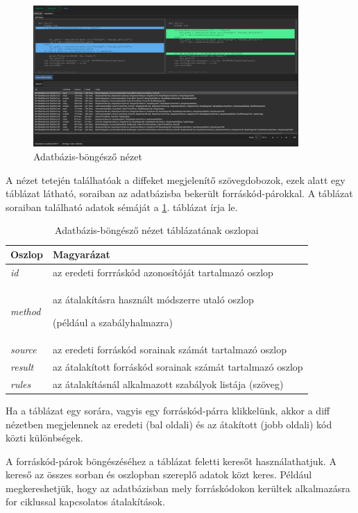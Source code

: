 \begin{figure}[H]
	\centering
	\includegraphics[width=0.9\textwidth]{images/screenshots/database_tab.png}
	\caption{Adatbázis-böngésző nézet}
\end{figure}

A nézet tetején találhatóak a diffeket megjelenítő szövegdobozok, ezek alatt
egy táblázat látható, soraiban az adatbázisba bekerült forráskód-párokkal.
A táblázat soraiban található adatok sémáját a \ref{tab:schema}. táblázat írja le.

\begin{table}[H]
	\centering
	\begin{tabular}{ | m{} | m{} | }
		\hline
		\textbf{Oszlop} & \textbf{Magyarázat} \\
		\hline \hline

		\emph{id}
		& az eredeti forrráskód azonosítóját tartalmazó oszlop \\
		\hline
		
		\emph{method}
		& az átalakításra használt módszerre utaló oszlop
		
		(például a szabályhalmazra) \\
		\hline
		
		\emph{source}
		& az eredeti forráskód sorainak számát tartalmazó oszlop \\
		\hline
		
		\emph{result}
		& az átalakított forráskód sorainak számát tartalmazó oszlop \\
		\hline
		
		\emph{rules}
		& az átalakításnál alkalmazott szabályok listája (szöveg) \\
		\hline
	\end{tabular}
	\caption{Adatbázis-böngésző nézet táblázatának oszlopai}
	\label{tab:schema}
\end{table}

Ha a táblázat egy sorára, vagyis egy forráskód-párra klikkelünk,
akkor a diff nézetben megjelennek az eredeti (bal oldali) és az átakított (jobb oldali)
kód közti különbségek.

A forráskód-párok böngészéséhez a táblázat feletti keresőt használathatjuk.
A kereső az összes sorban és oszlopban szereplő adatok közt keres.
Például megkereshetjük, hogy az adatbázisban mely forráskódokon kerültek alkalmazásra
for ciklussal kapcsolatos átalakítások.
